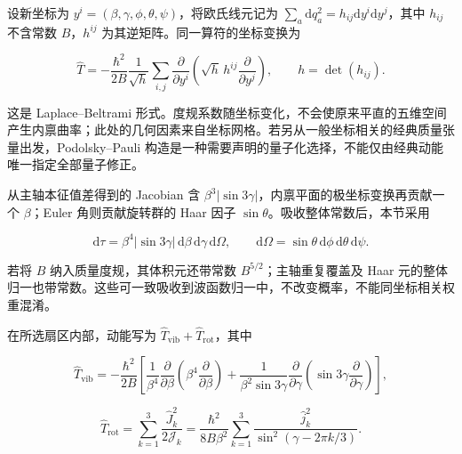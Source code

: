 设新坐标为 $y^i=(\beta,\gamma,\phi,\theta,\psi)$，将欧氏线元记为 $\sum_a\mathrm dq_a^2=h_{ij}\mathrm dy^i\mathrm dy^j$，其中 $h_{ij}$ 不含常数 $B$，$h^{ij}$ 为其逆矩阵。同一算符的坐标变换为

\begin{equation}\label{eq:2-4-10}
\hat T=-\frac{\hbar^2}{2B}
\frac{1}{\sqrt h}\sum_{i,j}
\frac{\partial}{\partial y^i}
\left(\sqrt h\,h^{ij}\frac{\partial}{\partial y^j}\right),
\qquad h=\det(h_{ij}).
\end{equation}

这是 Laplace–Beltrami 形式。度规系数随坐标变化，不会使原来平直的五维空间产生内禀曲率；此处的几何因素来自坐标网格。若另从一般坐标相关的经典质量张量出发，Podolsky–Pauli 构造是一种需要声明的量子化选择，不能仅由经典动能唯一指定全部量子修正\cite{prochniak-rohozinski-2009-bohr-collective-hamiltonian}。

从主轴本征值差得到的 Jacobian 含 $\beta^3|\sin3\gamma|$，内禀平面的极坐标变换再贡献一个 $\beta$；Euler 角则贡献旋转群的 Haar 因子 $\sin\theta$。吸收整体常数后，本节采用

\begin{equation}\label{eq:2-4-11}
\mathrm d\tau=\beta^4|\sin3\gamma|\,\mathrm d\beta\,\mathrm d\gamma\,\mathrm d\Omega,
\qquad
\mathrm d\Omega=\sin\theta\,\mathrm d\phi\,\mathrm d\theta\,\mathrm d\psi.
\end{equation}

若将 $B$ 纳入质量度规，其体积元还带常数 $B^{5/2}$；主轴重复覆盖及 Haar 元的整体归一也带常数。这些可一致吸收到波函数归一中，不改变概率，不能同坐标相关权重混淆\cite{prochniak-rohozinski-2009-bohr-collective-hamiltonian}。

在所选扇区内部，动能写为 $\hat T_{\mathrm{vib}}+\hat T_{\mathrm{rot}}$，其中

\begin{equation}\label{eq:2-4-12}
\hat T_{\mathrm{vib}}=-\frac{\hbar^2}{2B}
\left[
\frac{1}{\beta^4}\frac{\partial}{\partial\beta}
\left(\beta^4\frac{\partial}{\partial\beta}\right)
+
\frac{1}{\beta^2\sin3\gamma}\frac{\partial}{\partial\gamma}
\left(\sin3\gamma\frac{\partial}{\partial\gamma}\right)
\right],
\end{equation}

\begin{equation}\label{eq:2-4-13}
\hat T_{\mathrm{rot}}=\sum_{k=1}^{3}\frac{\hat J_k^2}{2\mathcal J_k}
=\frac{\hbar^2}{8B\beta^2}
\sum_{k=1}^{3}\frac{\hat j_k^2}
{\sin^2(\gamma-2\pi k/3)}.
\end{equation}

